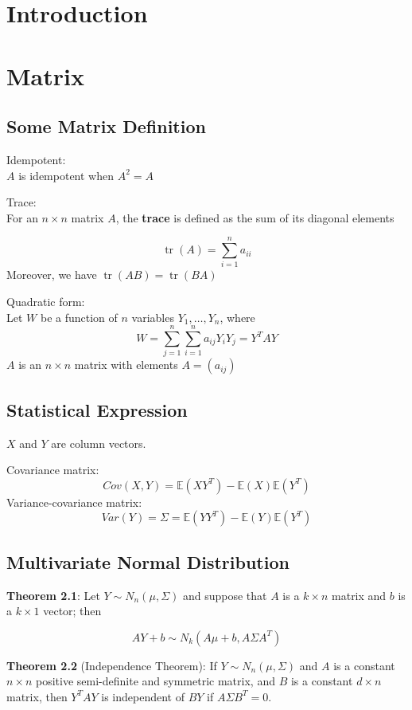 \documentclass[11pt,a4paper]{article}
\newcommand{\E}{\mathbb{E}}
\DeclareMathOperator{\tr}{tr}
\begin{document}
\makenotestitle

\tableofcontents
\newpage
{}

\section{Introduction}
\section{Matrix}
\subsection{Some Matrix Definition}
Idempotent: \\
$A$ is idempotent when $A^2 = A$ \par

Trace: \\
For an $n \times n$ matrix $A$, the \textbf{trace} is defined as the sum of its diagonal elements \par
\[
\tr(A) = \sum_{i=1}^{n} a_{ii}
\]
Moreover, we have $\tr(AB) = \tr(BA)$ \par

Quadratic form: \\
Let $W$ be a function of $n$ variables $Y_1, \dots, Y_n$, where
\[
W = \sum_{j=1}^{n} \sum_{i=1}^{n} a_{ij} Y_i Y_j = Y^T A Y
\]
$A$ is an $n \times n$ matrix with elements $A = (a_{ij})$

\subsection{Statistical Expression}
$X$ and $Y$ are column vectors. \par
Covariance matrix:
\[
Cov(X, Y) = \E(XY^T) - \E(X) \E(Y^T) 
\]
Variance-covariance matrix:
\[
Var(Y) = \Sigma = \E(YY^T) - \E(Y) \E(Y^T)
\]

\subsection{Multivariate Normal Distribution}
\textbf{Theorem 2.1}: Let $Y \sim N_n(\mu, \Sigma)$ and suppose that $A$ is a $k \times n$ matrix and $b$ is a $k \times 1$ vector; then \par
\[
AY + b \sim N_k(A\mu + b, A \Sigma A^T)
\] 

\textbf{Theorem 2.2} (Independence Theorem): If $Y \sim N_n(\mu, \Sigma)$ and $A$ is a constant $n \times n$ positive semi-definite and symmetric matrix, and $B$ is a constant $d \times n$ matrix, then $Y^TAY$ is independent of $BY$ if $A \Sigma B^T = 0$. \par
\end{document}
